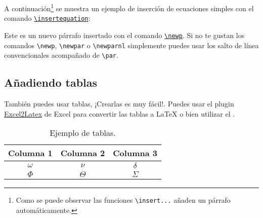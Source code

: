 		A continuación\footnote{Como se puede observar las funciones \texttt{\textbackslash insert...} añaden un párrafo automáticamente.} se muestra un ejemplo de inserción de ecuaciones simples con el comando \href{https://latex.ppizarror.com/informe.html#hlp-formulae}{\texttt{\textbackslash insertequation}}:


		\lipsum[75]

		\newp Este es un nuevo párrafo insertado con el comando \href{https://latex.ppizarror.com/informe.html#hlp-parrafo}{\texttt{\textbackslash newp}}. Si no te gustan los comandos \texttt{\textbackslash newp}, \texttt{\textbackslash newpar} o \texttt{\textbackslash newparnl} simplemente puedes usar los salto de línea convencionales acompañado de \texttt{\textbackslash par}.

	\subsection{Añadiendo tablas}

		También puedes usar tablas, ¡Crearlas es muy fácil!. Puedes usar el plugin \href{https://www.ctan.org/tex-archive/support/excel2latex/}{Excel2Latex} \cite{ref2} de Excel para convertir las tablas a \LaTeX\xspace o bien utilizar el  \cite{ref3}.

		\begin{table}[htbp]
			\centering
			\caption{Ejemplo de tablas.}
			\begin{tabular}{ccc}
				\hline
				\textbf{Columna 1} & \textbf{Columna 2} & \textbf{Columna 3} \bigstrut\\
				\hline
				$\omega$ & $\nu$ & $\delta$ \bigstrut[t]\\
				$\Phi$ & $\Theta$ & $\varSigma$ \bigstrut[b]\\
				\hline
			\end{tabular}
			\label{tab:tabla-1}
		\end{table}


